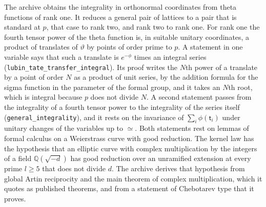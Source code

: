 \documentclass[11pt,letterpaper]{article}
\numberwithin{equation}{section}
\begin{document}
The archive obtains the integrality in orthonormal coordinates from theta functions of rank one. It reduces a general pair of lattices to a pair that is standard at $p$, that case to rank two, and rank two to rank one. For rank one the fourth tensor power of the theta function is, in suitable unitary coordinates, a product of translates of $\vartheta$ by points of order prime to $p$. A statement in one variable says that such a translate is $e^{-\phi}$ times an integral series (\texttt{lubin\_tate\_transfer\_integral}). Its proof writes the $N$th power of a translate by a point of order $N$ as a product of unit series, by the addition formula for the sigma function in the parameter of the formal group, and it takes an $N$th root, which is integral because $p$ does not divide $N$. A second statement passes from the integrality of a fourth tensor power to the integrality of the series itself (\texttt{general\_integrality}), and it rests on the invariance of $\sum_i\phi(\mathsf t_i)$ under unitary changes of the variables up to $\simeq$. Both statements rest on lemmas of formal calculus on a Weierstrass curve with good reduction. The kernel law has the hypothesis that an elliptic curve with complex multiplication by the integers of a field $\mathbb Q(\sqrt{-d})$ has good reduction over an unramified extension at every prime $l\ge5$ that does not divide $d$. The archive derives that hypothesis from global Artin reciprocity and the main theorem of complex multiplication, which it quotes as published theorems, and from a statement of Chebotarev type that it proves.
\end{document}
